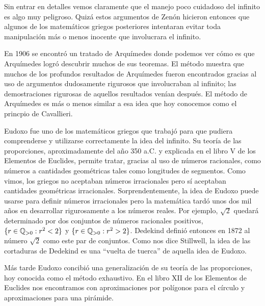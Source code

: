 Sin entrar en detalles vemos claramente que el manejo poco cuidadoso del
infinito es algo muy peligroso. Quizá estos argumentos de Zenón hicieron
entonces que algunos de los matemáticos griegos posteriores intentaran evitar
toda manipulación más o menos inocente que involucrara el infinito.

En 1906 se encontró un tratado de Arquímedes donde podemos ver cómo es que
Arquímedes logró descubrir muchos de sus teoremas. El método muestra que muchos
de los profundos resultados de Arquímedes fueron encontrados gracias al uso de
argumentos dudosamente rigurosos que involucraban al infinito; las
demostraciones rigurosas de aquellos resultados venían después. El método de
Arquímedes es más o menos similar a esa idea que hoy conocemos como el princpio
de Cavallieri.

Eudoxo fue uno de los matemáticos griegos que trabajó para que pudiera
comprenderse y utilizarse correctamente la idea del infinito. Su teoría de las
proporciones, aproximadamente del año 350 a.C. y explicada en el libro V de los
Elementos de Euclides, permite tratar, gracias al uso de números racionales,
como números a cantidades geométricas tales como longitudes de segmentos. Como
vimos, los griegos no aceptaban números irracionales pero sí aceptaban
cantidades geométricas irracionales. Sorprendentemente, la idea de Eudoxo puede
usarse para definir números irracionales pero la matemática tardó unos dos mil
años en desarrollar rigurosamente a los números reales. Por ejemplo, $\sqrt{2}$
quedará determinado por dos conjuntos de números racionales positivos,
$\{r\in\mathbb{Q}_{>0}:r^2<2\}$ y $\{r\in\mathbb{Q}_{>0}:r^2>2\}$. Dedekind definió entonces en
1872 al número $\sqrt{2}$ como este par de conjuntos. Como nos dice Stillwell,
la idea de las cortaduras de Dedekind es una ``vuelta de tuerca'' de aquella
idea de Eudoxo. 

Más tarde Eudoxo concibió una generalización de su teoría de las proporciones,
hoy conocida como el método exhaustivo. En el libro XII de los Elementos de
Euclides nos encontramos con aproximaciones por polígonos para el círculo y
aproximaciones para una pirámide. 

